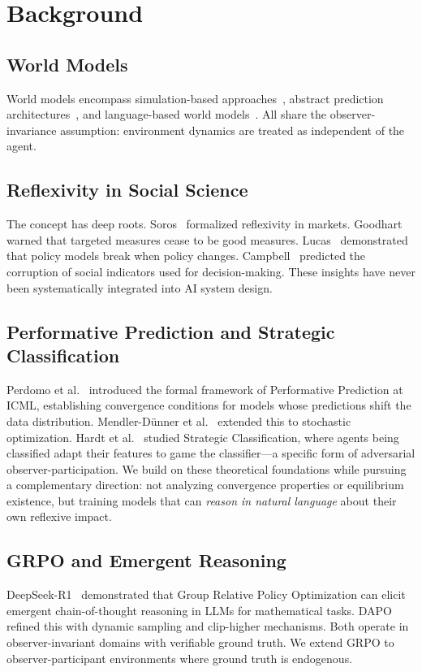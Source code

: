 \documentclass[11pt,a4paper]{article}
\begin{document}
\section{Background}

\subsection{World Models}
World models encompass simulation-based approaches~\citep{ha2018,hafner2020}, abstract prediction architectures~\citep{lecun2022,assran2023}, and language-based world models~\citep{li2024,xiang2024}. All share the observer-invariance assumption: environment dynamics are treated as independent of the agent.

\subsection{Reflexivity in Social Science}
The concept has deep roots. Soros~\citep{soros1987} formalized reflexivity in markets. Goodhart~\citep{goodhart1975} warned that targeted measures cease to be good measures. Lucas~\citep{lucas1976} demonstrated that policy models break when policy changes. Campbell~\citep{campbell1979} predicted the corruption of social indicators used for decision-making. These insights have never been systematically integrated into AI system design.

\subsection{Performative Prediction and Strategic Classification}
Perdomo et al.~\citep{perdomo2020} introduced the formal framework of Performative Prediction at ICML, establishing convergence conditions for models whose predictions shift the data distribution. Mendler-D\"{u}nner et al.~\citep{mendler2020} extended this to stochastic optimization. Hardt et al.~\citep{hardt2016} studied Strategic Classification, where agents being classified adapt their features to game the classifier---a specific form of adversarial observer-participation. We build on these theoretical foundations while pursuing a complementary direction: not analyzing convergence properties or equilibrium existence, but training models that can \textit{reason in natural language} about their own reflexive impact.

\subsection{GRPO and Emergent Reasoning}
DeepSeek-R1~\citep{guo2025} demonstrated that Group Relative Policy Optimization can elicit emergent chain-of-thought reasoning in LLMs for mathematical tasks. DAPO~\citep{yu2025} refined this with dynamic sampling and clip-higher mechanisms. Both operate in observer-invariant domains with verifiable ground truth. We extend GRPO to observer-participant environments where ground truth is endogenous.
\end{document}
